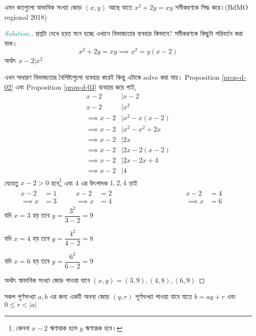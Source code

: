 \documentclass[a4paper,11pt]{article}
\newenvironment{sltn}{\begin{proof}[\emph{\textcolor{darkcyan}{Solution.}}]} {\end{proof}}
\begin{document}
\begin{xmpl}
	এমন কতগুলো স্বাভাবিক সংখ্যা জোড় $(x,y)$ আছে যাতে $x^2+2y=xy$ সমীকরণকে সিদ্ধ করে।(BdMO regional 2018) 
\end{xmpl}
\begin{sltn}
	প্রশ্নটা দেখে হয়ত মনে হচ্ছে এখানে বিভাজ্যতার ব্যবহার কিভাবে? সমীকরণকে কিছুটা পরিবর্তন করা যাক। 
	\[x^2+2y=xy \implies x^2=y(x-2)\]
	অর্থাৎ $x-2|x^2$
	
	এখন সাধারণ বিভাজ্যতার বৈশিষ্ট্যগুলো ব্যবহার করেই কিন্তু এটাকে solve করা যায়। Proposition \ref{prop-d-02} এবং Proposition \ref{prop-d-03} ব্যবহার করে পাই,
	\begin{align*}
		x-2          & |x-2        \\
		x-2          & |x^2        \\
		\implies x-2 & |x^2-x(x-2) \\
		\implies x-2 & |x^2-x^2+2x \\
		\implies x-2 & |2x         \\
		\implies x-2 & |2x-2(x-2)  \\
		\implies x-2 & |2x-2x+4    \\
		\implies x-2 & |4
	\end{align*}
	যেহেতু $x-2>0$ হবে\footnote{কেননা $x-2$ ঋণাত্মক হলে $y$ ঋণাত্মক হবে।} এবং $4$ এর উৎপাদক $1,2,4$ তাই 
	\begin{align*}
		\begin{split}
			x-2&=1\\
			\implies x&=3
		\end{split}
		\qquad
		\begin{split}
			x-2&=2\\
			\implies x&=4
		\end{split}
		\qquad \qquad \qquad \qquad \qquad 
		\begin{split}
			x-2&=4\\
			\implies x&=6
		\end{split}
		\qquad
	\end{align*}
	যদি $x=3$ হয় তবে $y=\dfrac{3^2}{3-2}=9$
	
	যদি $x=4$ হয় তবে $y=\dfrac{4^2}{4-2}=8$
	
	যদি $x=6$ হয় তবে $y=\dfrac{6^2}{6-2}=9$
	
	অর্থাৎ স্বাভাবিক সংখ্যা জোড় পাওয়া যাবে $(x,y)=(3,9),(4,8),(6,9)$
\end{sltn}
\begin{thrm}
	সকল পূর্ণসংখ্যা $a,b$ এর জন্য একটি অনন্য জোড় $(q,r)$ পূর্ণসংখ্যা পাওয়া যাবে যাতে $b=aq+r$ এবং $0 \leq r < |a|$
\end{thrm}
\end{document}
